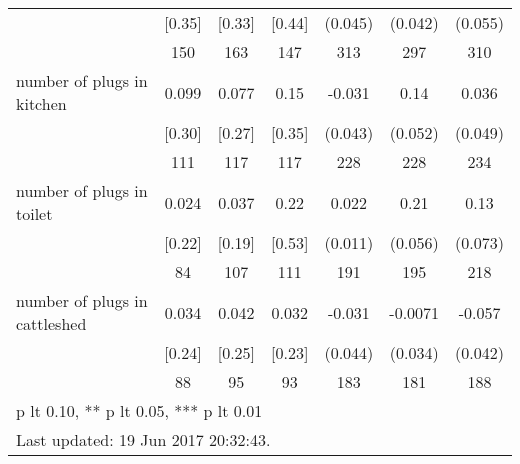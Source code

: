 \begin{table}[htbp]
\begin{tabular*}{1\hsize}{@{\hskip\tabcolsep\extracolsep\fill}l*{1}{cccccc}}
                                &   [0.35]&   [0.33]&   [0.44]&  (0.045)         &  (0.042)         &  (0.055)         \\
                                &      150&      163&      147&      313         &      297         &      310         \\
number of plugs in kitchen      &    0.099&    0.077&     0.15&   -0.031         &     0.14\sym{**} &    0.036         \\
                                &   [0.30]&   [0.27]&   [0.35]&  (0.043)         &  (0.052)         &  (0.049)         \\
                                &      111&      117&      117&      228         &      228         &      234         \\
number of plugs in toilet       &    0.024&    0.037&     0.22&    0.022\sym{*}  &     0.21\sym{***}&     0.13\sym{*}  \\
                                &   [0.22]&   [0.19]&   [0.53]&  (0.011)         &  (0.056)         &  (0.073)         \\
                                &       84&      107&      111&      191         &      195         &      218         \\
number of plugs in cattleshed   &    0.034&    0.042&    0.032&   -0.031         &  -0.0071         &   -0.057         \\
                                &   [0.24]&   [0.25]&   [0.23]&  (0.044)         &  (0.034)         &  (0.042)         \\
                                &       88&       95&       93&      183         &      181         &      188         \\
\bottomrule
\multicolumn{7}{l}{\footnotesize * p lt 0.10, ** p lt 0.05, *** p lt 0.01}\\
\multicolumn{7}{l}{\footnotesize Last updated: 19 Jun 2017 20:32:43.}\\
\end{tabular*}
\end{table}
